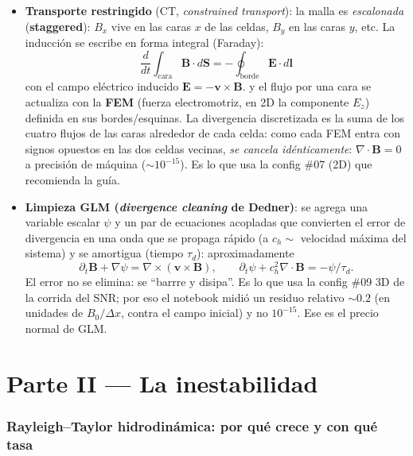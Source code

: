 \documentclass[11pt,a4paper]{article}
\newcommand{\B}{\mathbf{B}}
\newcommand{\vct}{\mathbf{v}}
\newcommand{\dif}{\partial_t}
\newcommand{\term}[1]{\textbf{#1}}
\begin{document}
\begin{itemize}
  \item \term{Transporte restringido} (CT, \emph{constrained transport}): la malla es
  \emph{escalonada} (\term{staggered}): $B_x$ vive en las caras $x$ de las celdas,
  $B_y$ en las caras $y$, etc. La inducción se escribe en forma integral (Faraday):
  \begin{equation}
  \frac{d}{dt}\int_\mathrm{cara}\B\cdot d\mathbf{S} = -\oint_\mathrm{borde}\mathbf{E}\cdot d\mathbf{l}
  \end{equation}
  con el campo eléctrico inducido $\mathbf{E}=-\vct\times\B$.
  y el flujo por una cara se actualiza con la \term{FEM} (fuerza electromotriz, en 2D la
  componente $E_z$) definida en sus bordes/esquinas. La divergencia discretizada es la suma
  de los cuatro flujos de las caras alrededor de cada celda: como cada FEM entra con signos
  opuestos en las dos celdas vecinas, \emph{se cancela idénticamente}: $\nabla\cdot\B=0$ a
  precisión de máquina ($\sim10^{-15}$). Es lo que usa la config \#07 (2D) que recomienda la
  guía.
  \item \term{Limpieza GLM (\emph{divergence cleaning} de Dedner)}: se agrega una variable
  escalar $\psi$ y un par de ecuaciones acopladas que convierten el error de divergencia en
  una onda que se propaga rápido (a $c_h\sim$ velocidad máxima del sistema) y se amortigua
  (tiempo $\tau_d$): aproximadamente
  \begin{equation}
  \dif{\B}+\nabla\psi=\nabla\times(\vct\times\B),\qquad
  \dif{\psi}+c_h^2\nabla\cdot\B=-\psi/\tau_d .
  \end{equation}
  El error no se elimina: se ``barrre y disipa''. Es lo que usa la config \#09 3D de la
  corrida del SNR; por eso el notebook midió un residuo relativo $\sim0.2$ (en unidades de
  $B_0/\Delta x$, contra el campo inicial) y no $10^{-15}$. Ese es el precio normal de GLM.
\end{itemize}

\part*{Parte II --- La inestabilidad}

\section{Rayleigh--Taylor hidrodinámica: por qué crece y con qué tasa}
\end{document}
